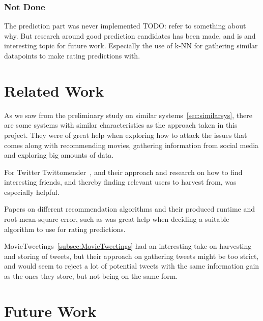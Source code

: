 \subsubsection{Not Done}
The prediction part was never implemented TODO: refer to something about why. But research around good prediction candidates has been made, and is and interesting topic for future work. Especially the use of k-NN for gathering similar datapoints to make rating predictions with.





\section{Related Work}
As we saw from the preliminary study on similar systems~\ref{sec:similarsys}, there are some systems with similar characteristics as the approach taken in this project. They were of great help when exploring how to attack the issues that comes along with recommending movies, gathering information from social media and exploring big amounts of data.

For Twitter Twittomender~\cite{twittomender}, and their approach and research on how to find interesting friends, and thereby finding relevant users to harvest from, was especially helpful.

Papers on different recommendation algorithms and their produced runtime and root-mean-square error, such as \cite{bigchaos-sol,alsMPI,BellKor-CF-TD} was great help when deciding a suitable algorithm to use for rating predictions.

MovieTweetings~\ref{subsec:MovieTweetings} had an interesting take on harvesting and storing of tweets, but their approach on gathering tweets might be too strict, and would seem to reject a lot of potential tweets with the same information gain as the ones they store, but not being on the same form.




\section{Future Work}
